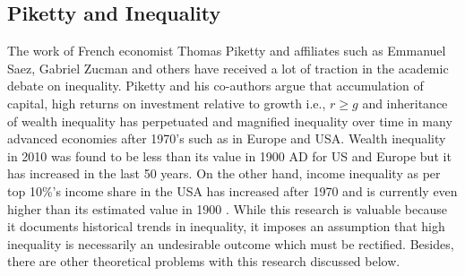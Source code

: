 \documentclass[12pt]{article}
\newcommand{\1}{\mathbbm 1}
\begin{document}
	    
	    
	   
	    
	   
	    
	    
	    
		
		
		
		\subsection{Piketty and Inequality} 
		
		
		The work of French economist Thomas Piketty \cite{piketty2017capital} and affiliates such as Emmanuel Saez, Gabriel Zucman and others have received a lot of traction in the academic debate on inequality. Piketty and his co-authors argue that accumulation of capital, high returns on investment relative to growth i.e., $r \geq g$ and inheritance of wealth inequality has perpetuated and magnified inequality over time in many advanced economies after 1970's such as in Europe and USA. Wealth inequality in 2010 was found to be less than its value in 1900 AD for US and Europe but it has increased in the last 50 years. On the other hand, income inequality as per top 10\%'s income share in the USA has increased after 1970 and is currently even higher than its estimated value in 1900 \cite{chancel2022world}. While this research is valuable because it documents historical trends in inequality, it imposes an assumption that high inequality is necessarily an undesirable outcome which must be rectified. Besides, there are other theoretical problems with this research discussed below. 
		
\end{document}
